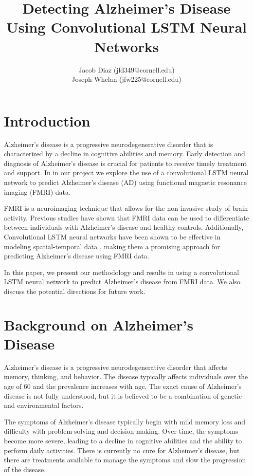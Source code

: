 \documentclass[11pt]{article}
\title{Detecting Alzheimer's Disease Using Convolutional LSTM Neural Networks}
\author{
  Jacob Diaz (jld349@cornell.edu) \\
  Joseph Whelan (jfw225@cornell.edu)
}
\begin{document}
 
	
	\maketitle
	
	\section{Introduction}

	Alzheimer's disease is a progressive neurodegenerative disorder that is characterized by a decline in cognitive abilities and memory. Early detection and diagnosis of Alzheimer's disease is crucial for patients to receive timely treatment and support. In in our project we explore the use of a convolutional LSTM neural network to predict Alzheimer's disease (AD) using functional magnetic resonance imaging (FMRI) data.

	FMRI is a neuroimaging technique that allows for the non-invasive study of brain activity. Previous studies have shown that FMRI data can be used to differentiate between individuals with Alzheimer's disease and healthy controls. Additionally, Convolutional LSTM neural networks have been shown to be effective in modeling spatial-temporal data \cite{survey}, making them a promising approach for predicting Alzheimer's disease using FMRI data.

	In this paper, we present our methodology and results in using a convolutional LSTM neural network to predict Alzheimer's disease from FMRI data. We also discuss the potential directions for future work.

	\section{Background on Alzheimer's Disease}

	Alzheimer's disease is a progressive neurodegenerative disorder that affects memory, thinking, and behavior. The disease typically affects individuals over the age of 60 and the prevalence increases with age. The exact cause of Alzheimer's disease is not fully understood, but it is believed to be a combination of genetic and environmental factors. 

	The symptoms of Alzheimer's disease typically begin with mild memory loss and difficulty with problem-solving and decision-making. Over time, the symptoms become more severe, leading to a decline in cognitive abilities and the ability to perform daily activities. There is currently no cure for Alzheimer's disease, but there are treatments available to manage the symptoms and slow the progression of the disease. 
\end{document}
